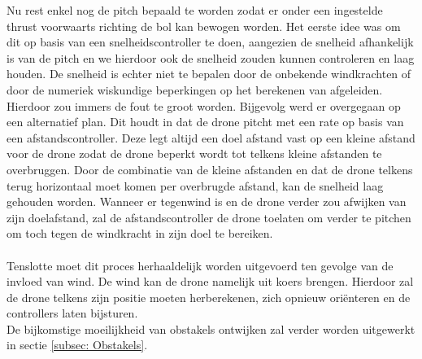 Nu rest enkel nog de pitch bepaald te worden zodat er onder een ingestelde thrust voorwaarts richting de bol kan bewogen worden. Het eerste idee was om dit op basis van een snelheidscontroller te doen, aangezien de snelheid afhankelijk is van de pitch en we hierdoor ook de snelheid zouden kunnen controleren en laag houden. De snelheid is echter niet te bepalen door de onbekende windkrachten of door de numeriek wiskundige beperkingen op het berekenen van afgeleiden. Hierdoor zou immers de fout te groot worden. Bijgevolg werd er overgegaan op een alternatief plan. Dit houdt in dat de drone pitcht met een rate op basis van een afstandscontroller. Deze legt altijd een doel afstand vast op een kleine afstand voor de drone zodat de drone beperkt wordt tot telkens kleine afstanden te overbruggen. Door de combinatie van de kleine afstanden en dat de drone telkens terug horizontaal moet komen per overbrugde afstand, kan de snelheid laag gehouden worden. Wanneer er tegenwind is en de drone verder zou afwijken van zijn doelafstand, zal de afstandscontroller de drone toelaten om verder te pitchen om toch tegen de windkracht in zijn doel te bereiken.
\\
\\
Tenslotte moet dit proces herhaaldelijk worden uitgevoerd ten gevolge van de invloed van wind. De wind kan de drone namelijk uit koers brengen. Hierdoor zal de drone telkens zijn positie moeten herberekenen, zich opnieuw ori\"enteren en de controllers laten bijsturen.
\\
De bijkomstige moeilijkheid van obstakels ontwijken zal verder worden uitgewerkt in sectie \ref{subsec: Obstakels}.